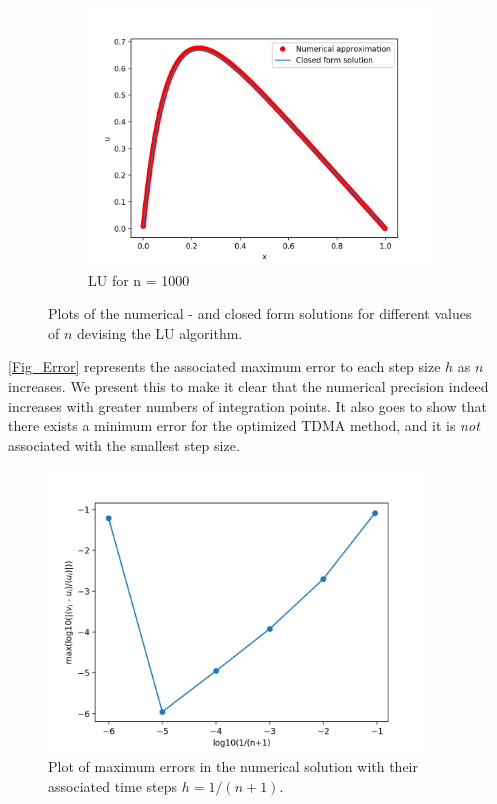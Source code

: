\documentclass[a4paper, english]{amsart} %
\begin{document}
\begin{figure}[H]
\begin{subfigure}[b]{0.3\linewidth}
		\includegraphics[width=\linewidth]{Figur/LU_1000.png}
		\caption{LU for n = 1000}
		\label{Fig_LU1000}
	\end{subfigure}
	\caption{Plots of the numerical - and closed form solutions for different values of $n$ devising the LU algorithm.}
	\label{Fig_LU}
\end{figure}

\autoref{Fig_Error} represents the associated maximum error to each step size $h$ as $n$ increases. We present this to make it clear that the numerical precision indeed increases with greater numbers of integration points. It also goes to show that there exists a minimum error for the optimized TDMA method, and it is \emph{not} associated with the smallest step size. 
\begin{figure}[H]
\centering
\includegraphics[width=10cm]{Figur/Error_TDMA.png}
\caption{Plot of maximum errors in the numerical solution with their associated time steps $h = 1/(n+1)$.}
\label{Fig_Error}
\end{figure}
\end{document}
